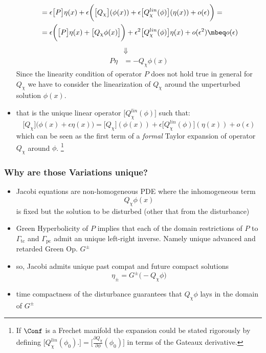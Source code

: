 \documentclass[a4paper,11pt]{scrartcl}
\begin{document}
\begin{itemize}
\begin{align*}
            & =  \epsilon  \big[P\big] \eta(x) + \epsilon \biggr( \big[Q_\chi \big]( \phi(x)) + \epsilon \big[Q_\chi^{lin}(\phi)  \big]( \eta(x)) + o(\epsilon) \biggr) = \\
            & = \epsilon \biggr( \big[P\big] \eta(x) + \big[Q_\chi \phi(x) \big]\biggr)+ \epsilon^2 \big[Q_\chi^{lin}(\phi)  \big]    \eta(x) + o(\epsilon^ 2) \mbeq o(\epsilon)
           \end{align*}
           \begin{align*}
                       & \Downarrow \\
             P \eta &= - Q_\chi \phi(x)
           \end{align*}
        Since the linearity condition of operator $P$ does not hold true in general for $Q_\chi$ we have to consider the linearization of $Q_\chi$ around the unperturbed solution $\phi(x)$.
        \item that is the unique linear operator $\big[Q_\chi^{lin}(\phi) \big]$ such that:
            $$             \big[Q_\chi \big]( \phi(x) + \epsilon \eta(x)\big)= \big[Q_\chi \big]( \phi(x)) + \epsilon \big[Q_\chi^{lin}(\phi)  \big]( \eta(x)) + o(\epsilon) $$
        which can be seen as the first term of a \emph{formal} Taylor expansion of operator $Q_\chi$ around $\phi$.
        \footnote{If $\Conf$ is a Frechet manifold the expansion could be stated rigorously by defining $\big[Q_\chi^{lin}(\phi_0) . \big] = \big[\frac{\partial Q_\chi}{\partial \phi} (\phi_0)\big] $ in terms of the Gateaux derivative.}
        \end{itemize}
        \subsubsection*{Why are those Variations unique?}
        \begin{itemize}
           \item Jacobi equations are non-homogeneous PDE where the inhomogeneous term $$ Q_\chi \phi(x) $$ is fixed but the solution to be disturbed (other that from the disturbance)
           \item Green Hyperbolicity of $P$ implies that each of the domain restrictions of $P$ to 
           $\Gamma_{\textrm{tc}}$ and $\Gamma_{\textrm{pc}}$
           admit an unique left-right inverse. Namely unique advanced and retarded Green Op. $G^\pm$
           \item so, Jacobi admits unique past compat and future compact solutions
           $$ \eta_\pm = G^\pm \big( - Q_\chi \phi \big) $$
           \item time compactness of the disturbance guarantees that  $Q_\chi \phi$ lays in the domain of $G^\pm$
    \end{itemize}
\end{document}
